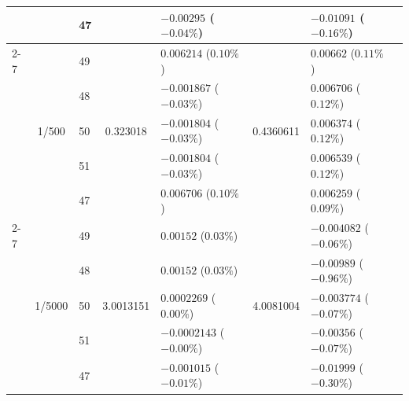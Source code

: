 \begin{table}[htbp]
{\begin{tabular}{lclclclc}
    &                        & 47 &                          & $-0.00295$ ($-0.04\%$)   &                          & $-0.01091$ ($-0.16\%$)    \\
    \cmidrule(lr){2-7}
    & \multirow{5}{*}{1/500} & 49 & \multirow{5}{*}{0.323018}  & $0.006214$ ($0.10\%$)    & \multirow{5}{*}{0.4360611} & $0.00662$ ($0.11\%$)      \\
    &                        & 48 &                          & $-0.001867$ ($-0.03\%$)  &                          & $0.006706$ ($0.12\%$)     \\
    &                        & 50 &                          & $-0.001804$ ($-0.03\%$)  &                          & $0.006374$ ($0.12\%$)     \\
    &                        & 51 &                          & $-0.001804$ ($-0.03\%$)  &                          & $0.006539$ ($0.12\%$)     \\
    &                        & 47 &                          & $0.006706$ ($0.10\%$)    &                          & $0.006259$ ($0.09\%$)     \\
    \cmidrule(lr){2-7}
    & \multirow{5}{*}{1/5000}& 49 & \multirow{5}{*}{3.0013151} & $0.00152$ ($0.03\%$)     & \multirow{5}{*}{4.0081004} & $-0.004082$ ($-0.06\%$)   \\
    &                         & 48 &                          & $0.00152$ ($0.03\%$)     &                          & $-0.00989$ ($-0.96\%$)    \\
    &                         & 50 &                          & $0.0002269$ ($0.00\%$)   &                          & $-0.003774$ ($-0.07\%$)   \\
    &                         & 51 &                          & $-0.0002143$ ($-0.00\%$) &                          & $-0.00356$ ($-0.07\%$)    \\
    &                         & 47 &                          & $-0.001015$ ($-0.01\%$)  &                          & $-0.01999$ ($-0.30\%$)    \\
    \bottomrule
  \end{tabular}%
  }
\end{table}
